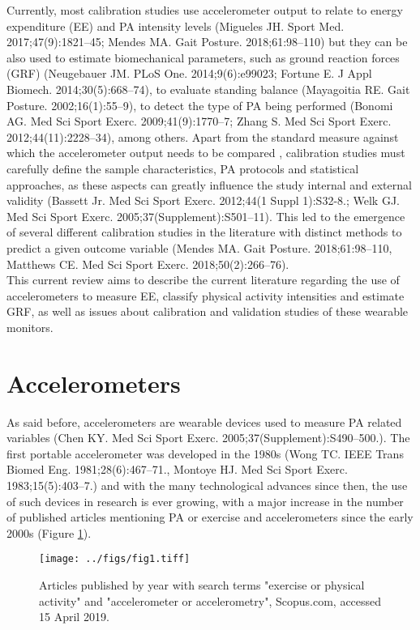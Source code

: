 \documentclass[11pt]{article}
\begin{document}
Currently, most calibration studies use accelerometer output to relate to energy expenditure (EE) and PA intensity levels {\tiny (Migueles JH. Sport Med. 2017;47(9):1821–45; Mendes MA. Gait Posture. 2018;61:98–110)} but they can be also used to estimate biomechanical parameters, such as ground reaction forces (GRF) {\tiny (Neugebauer JM. PLoS One. 2014;9(6):e99023; Fortune E. J Appl Biomech. 2014;30(5):668–74)}, to evaluate standing balance	{\tiny (Mayagoitia RE. Gait Posture. 2002;16(1):55–9)}, to detect the type of PA being performed {\tiny (Bonomi AG. Med Sci Sport Exerc. 2009;41(9):1770–7; Zhang S. Med Sci Sport Exerc. 2012;44(11):2228–34)}, among others. Apart from the standard measure against which the accelerometer output needs to be compared	, calibration studies must carefully define the sample characteristics, PA protocols and statistical approaches, as these aspects can greatly influence the study internal and external validity {\tiny (Bassett  Jr. Med Sci Sport Exerc. 2012;44(1 Suppl 1):S32-8.; Welk GJ. Med Sci Sport Exerc. 2005;37(Supplement):S501–11)}. This led to the emergence of several different calibration studies in the literature with distinct methods to predict a given outcome variable {\tiny (Mendes MA. Gait Posture. 2018;61:98–110, Matthews CE. Med Sci Sport Exerc. 2018;50(2):266–76)}. \\

This current review aims to describe the current literature regarding the use of accelerometers to measure EE, classify physical activity intensities and estimate GRF, as well as issues about calibration and validation studies of these wearable monitors. 

\section*{Accelerometers}

As said before, accelerometers are wearable devices used to measure PA related variables {\tiny (Chen KY. Med Sci Sport Exerc. 2005;37(Supplement):S490–500.)}. The first portable accelerometer was developed in the 1980s {\tiny (Wong TC. IEEE Trans Biomed Eng. 1981;28(6):467–71., Montoye HJ. Med Sci Sport Exerc. 1983;15(5):403–7.)} and with the many technological advances since then, the use of such devices in research is ever growing, with a major increase in the number of published articles mentioning PA or exercise and accelerometers since the early 2000s (Figure \ref{art_year}).

\begin{figure}[h!]
	\texttt{[image: ../figs/fig1.tiff]}
	\caption{Articles published by year with search terms "exercise or physical activity" and "accelerometer or accelerometry", Scopus.com, accessed 15 April 2019.}
	\label{art_year}
\end{figure}
\end{document}
